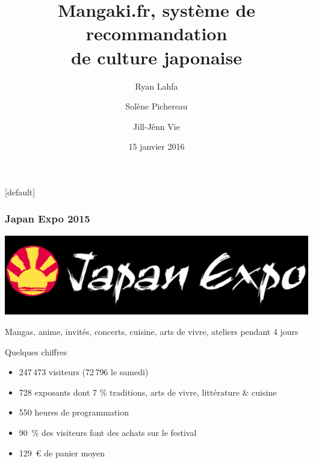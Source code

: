 \documentclass[handout]{beamer}
\title[]
{Mangaki.fr, système de recommandation\\de culture japonaise}
\author[]
{Ryan Lahfa \and Solène Pichereau \and Jill-Jênn Vie}
\institute[]
{Concours de la MCJP 2016}
\date
{15 janvier 2016}
\begin{document}

{
[default]
\begin{frame}
	\titlepage
\end{frame}
}

\begin{frame}
	\frametitle{Japan Expo 2015}
	\begin{center}
	\includegraphics[width=0.5\linewidth]{figures/japanexpo.png}\\
	\end{center}
	Mangas, anime, invités, concerts, cuisine, arts de vivre, ateliers pendant \alert{4 jours}
	\pause
	\begin{block}{Quelques chiffres}
	\begin{itemize}[<+->]
	\item 247\,473 visiteurs (72\,796 le samedi)
	\item 728 exposants dont 7 \% traditions, arts de vivre, littérature \& cuisine
	\item 550 heures de programmation
	\item 90~\% des visiteurs font des achats sur le festival
	\item 129~\euro{} de panier moyen
	\end{itemize}
	\end{block}
\end{frame}
\end{document}
